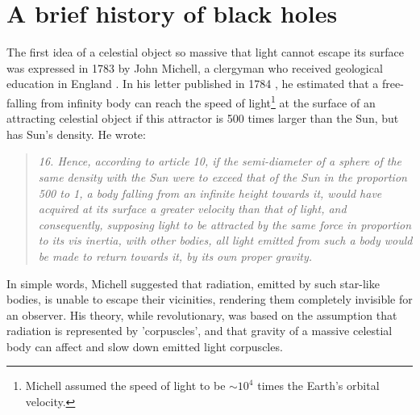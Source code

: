 \chapter{A brief history of black holes}

The first idea of a celestial object so massive that light cannot escape its surface was expressed in 1783 by John Michell, a clergyman who received geological education in England \citep{Pounds2014}.
In his letter published in 1784 \citep{Michell1784}, he estimated that a free-falling from infinity body can reach the speed of light\footnote{Michell assumed the speed of light to be $\sim 10^4$ times the Earth's orbital velocity. 
} at the surface of an attracting celestial object if this attractor is 500 times larger than the Sun, but has Sun's density.
He wrote:
\begin{quotation}
    \textit{
        16. Hence, according to article 10, if the semi-diameter of a sphere of the same density with the Sun were to exceed that of the Sun in the proportion 500 to 1, a body falling from an infinite height towards it, would have acquired at its surface a greater velocity than that of light, and consequently, supposing light to be attracted by the same force in proportion to its vis inertia, with other bodies, all light emitted from such a body would be made to return towards it, by its own proper gravity.
    }
\end{quotation}
In simple words, Michell suggested that radiation, emitted by such star-like bodies, is unable to escape their vicinities, rendering them completely invisible for an observer.
His theory, while revolutionary, was based on the assumption that radiation is represented by 'corpuscles', and that gravity of a massive celestial body can affect and slow down emitted light corpuscles.

